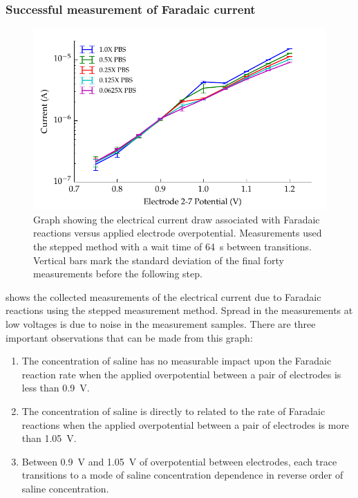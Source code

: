         \subsubsection*{Successful measurement of Faradaic current}
        \begin{figure}
          \centering
          \includegraphics{content/pt2/08-InterfaceParameters/graphics/graph_currentVoltage_logY_Thesis}
          \caption{\label{fig:graph_currentVoltage_logY_Thesis}Graph showing the electrical current draw associated with Faradaic reactions versus applied electrode overpotential. Measurements used the stepped method with a wait time of \SI{64}{\second} between transitions. Vertical bars mark the standard deviation of the final forty measurements before the following step.}
        \end{figure}
         shows the collected measurements of the electrical current due to Faradaic reactions using the stepped measurement method.
        Spread in the measurements at low voltages is due to noise in the measurement samples.
        There are three important observations that can be made from this graph:
        \begin{enumerate}
          \item The concentration of saline has no measurable impact upon the Faradaic reaction rate when the applied overpotential between a pair of electrodes is less than \SI{0.9}{\volt}.
          \item The concentration of saline is directly to related to the rate of Faradaic reactions when the applied overpotential between a pair of electrodes is more than \SI{1.05}{\volt}.
          \item Between \SI{0.9}{\volt} and \SI{1.05}{\volt} of overpotential between electrodes, each trace transitions to a mode of saline concentration dependence in reverse order of saline concentration.
        \end{enumerate}

